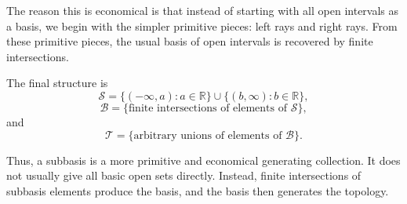 \documentclass{article}
\begin{document}
	The reason this is economical is that instead of starting with all open intervals as a basis, we begin with the simpler primitive pieces: left rays and right rays. From these primitive pieces, the usual basis of open intervals is recovered by finite intersections.
	
	The final structure is
	$$
	\mathcal S
	=
	\{(-\infty,a):a\in\mathbb R\}
	\cup
	\{(b,\infty):b\in\mathbb R\},
	$$
	$$
	\mathcal B
	=
	\{\text{finite intersections of elements of }\mathcal S\},
	$$
	and
	$$
	\mathcal T
	=
	\{\text{arbitrary unions of elements of }\mathcal B\}.
	$$
	
	Thus, a subbasis is a more primitive and economical generating collection. It does not usually give all basic open sets directly. Instead, finite intersections of subbasis elements produce the basis, and the basis then generates the topology.
\end{document}
